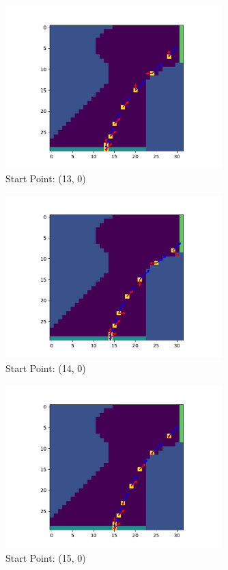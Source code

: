 \documentclass{article}
\begin{document}
\begin{figure}[H]
	\centering
	\includegraphics[width=0.75\textwidth]{../figure/fig_13}
	\caption{Start Point: (13, 0)}
	\label{fig:fig_13}
\end{figure}


\begin{figure}[H]
	\centering
	\includegraphics[width=0.75\textwidth]{../figure/fig_14}
	\caption{Start Point: (14, 0)}
	\label{fig:fig_14}
\end{figure}


\begin{figure}[H]
	\centering
	\includegraphics[width=0.75\textwidth]{../figure/fig_15}
	\caption{Start Point: (15, 0)}
	\label{fig:fig_15}
\end{figure}
\end{document}
